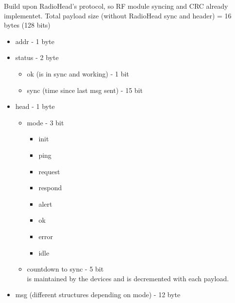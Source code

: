 Build upon RadioHead's protocol, so RF module syncing and CRC already implementet.
Total payload size (without RadioHead sync and header) = 16 bytes (128 bits)
\begin{itemize}
    \item addr - 1 byte
    \item status - 2 byte
    \begin{itemize}
        \item ok (is in sync and working) - 1 bit
        \item sync (time since last msg sent) - 15 bit
    \end{itemize}
    \item head - 1 byte
    \begin{itemize}
        \item mode - 3 bit
        \begin{itemize}
            \item init 
            \item ping
            \item request
            \item respond
            \item alert
            \item ok
            \item error
            \item idle
        \end{itemize}
        \item countdown to sync - 5 bit \\
        is maintained by the devices and is decremented with each payload.
    \end{itemize}
    \item msg (different structures depending on mode) - 12 byte
\end{itemize}

\bigskip
{}
